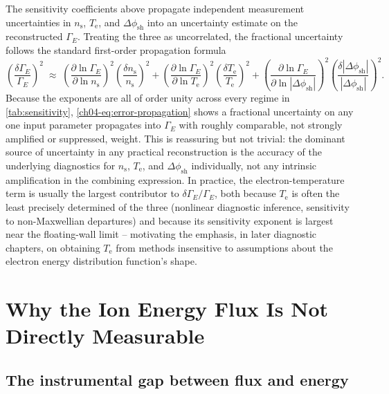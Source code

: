The sensitivity coefficients above propagate independent measurement uncertainties in $n_{\mathrm{s}}$, $T_{\mathrm{e}}$, and $\Delta\phi_{\mathrm{sh}}$ into an uncertainty estimate on the reconstructed $\Gamma_{E}$. Treating the three as uncorrelated, the fractional uncertainty follows the standard first-order propagation formula
\begin{equation}
\left(\frac{\delta \Gamma_{E}}{\Gamma_{E}}\right)^2 \;\approx\; \left(\frac{\partial \ln \Gamma_{E}}{\partial \ln n_{\mathrm{s}}}\right)^{2} \left(\frac{\delta n_{\mathrm{s}}}{n_{\mathrm{s}}}\right)^{2} + \left(\frac{\partial \ln \Gamma_{E}}{\partial \ln T_{\mathrm{e}}}\right)^{2} \left(\frac{\delta T_{\mathrm{e}}}{T_{\mathrm{e}}}\right)^{2} + \left(\frac{\partial \ln \Gamma_{E}}{\partial \ln |\Delta\phi_{\mathrm{sh}}|}\right)^{2} \left(\frac{\delta |\Delta\phi_{\mathrm{sh}}|}{|\Delta\phi_{\mathrm{sh}}|}\right)^{2}.
\label{ch04-eq:error-propagation}
\end{equation}
Because the exponents are all of order unity across every regime in \cref{tab:sensitivity}, \cref{ch04-eq:error-propagation} shows a fractional uncertainty on any one input parameter propagates into $\Gamma_{E}$ with roughly comparable, not strongly amplified or suppressed, weight. This is reassuring but not trivial: the dominant source of uncertainty in any practical reconstruction is the accuracy of the underlying diagnostics for $n_{\mathrm{s}}$, $T_{\mathrm{e}}$, and $\Delta\phi_{\mathrm{sh}}$ individually, not any intrinsic amplification in the combining expression. In practice, the electron-temperature term is usually the largest contributor to $\delta \Gamma_{E}/\Gamma_{E}$, both because $T_{\mathrm{e}}$ is often the least precisely determined of the three (nonlinear diagnostic inference, sensitivity to non-Maxwellian departures) and because its sensitivity exponent is largest near the floating-wall limit -- motivating the emphasis, in later diagnostic chapters, on obtaining $T_{\mathrm{e}}$ from methods insensitive to assumptions about the electron energy distribution function's shape.

\section{Why the Ion Energy Flux Is Not Directly Measurable}
\label{sec:observability}

\subsection{The instrumental gap between flux and energy}

